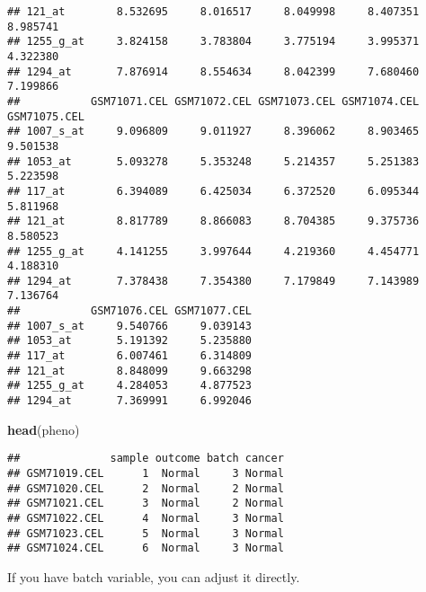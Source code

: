 \documentclass[]{article}
\newenvironment{Shaded}{\begin{snugshade}}{\end{snugshade}}
\newcommand{\KeywordTok}[1]{\textcolor[rgb]{0.13,0.29,0.53}{\textbf{#1}}}
\newcommand{\DataTypeTok}[1]{\textcolor[rgb]{0.13,0.29,0.53}{#1}}
\newcommand{\DecValTok}[1]{\textcolor[rgb]{0.00,0.00,0.81}{#1}}
\newcommand{\StringTok}[1]{\textcolor[rgb]{0.31,0.60,0.02}{#1}}
\newcommand{\OperatorTok}[1]{\textcolor[rgb]{0.81,0.36,0.00}{\textbf{#1}}}
\newcommand{\NormalTok}[1]{#1}
\begin{document}
\begin{verbatim}
## 121_at        8.532695     8.016517     8.049998     8.407351     8.985741
## 1255_g_at     3.824158     3.783804     3.775194     3.995371     4.322380
## 1294_at       7.876914     8.554634     8.042399     7.680460     7.199866
##           GSM71071.CEL GSM71072.CEL GSM71073.CEL GSM71074.CEL GSM71075.CEL
## 1007_s_at     9.096809     9.011927     8.396062     8.903465     9.501538
## 1053_at       5.093278     5.353248     5.214357     5.251383     5.223598
## 117_at        6.394089     6.425034     6.372520     6.095344     5.811968
## 121_at        8.817789     8.866083     8.704385     9.375736     8.580523
## 1255_g_at     4.141255     3.997644     4.219360     4.454771     4.188310
## 1294_at       7.378438     7.354380     7.179849     7.143989     7.136764
##           GSM71076.CEL GSM71077.CEL
## 1007_s_at     9.540766     9.039143
## 1053_at       5.191392     5.235880
## 117_at        6.007461     6.314809
## 121_at        8.848099     9.663298
## 1255_g_at     4.284053     4.877523
## 1294_at       7.369991     6.992046
\end{verbatim}

\begin{Shaded}
\begin{Highlighting}[]
\KeywordTok{head}\NormalTok{(pheno)}
\end{Highlighting}
\end{Shaded}

\begin{verbatim}
##              sample outcome batch cancer
## GSM71019.CEL      1  Normal     3 Normal
## GSM71020.CEL      2  Normal     2 Normal
## GSM71021.CEL      3  Normal     2 Normal
## GSM71022.CEL      4  Normal     3 Normal
## GSM71023.CEL      5  Normal     3 Normal
## GSM71024.CEL      6  Normal     3 Normal
\end{verbatim}

If you have batch variable, you can adjust it directly.

\begin{Shaded}
\end{Shaded}
\end{document}
